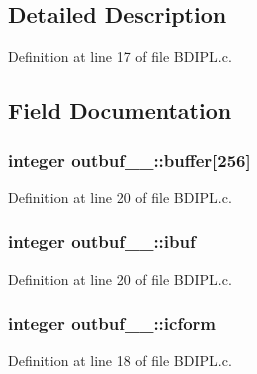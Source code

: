 \subsection{Detailed Description}


Definition at line 17 of file B\+D\+I\+P\+L.\+c.



\subsection{Field Documentation}
\subsubsection[{\texorpdfstring{buffer}{buffer}}]{\setlength{\rightskip}{0pt plus 5cm}integer outbuf\+\_\+\_\+\+::buffer\mbox{[}256\mbox{]}}\hypertarget{structoutbuf__1___a8eec95aab202f7fc976c344442d7a03d}{}\label{structoutbuf__1___a8eec95aab202f7fc976c344442d7a03d}


Definition at line 20 of file B\+D\+I\+P\+L.\+c.

\subsubsection[{\texorpdfstring{ibuf}{ibuf}}]{\setlength{\rightskip}{0pt plus 5cm}integer outbuf\+\_\+\_\+\+::ibuf}\hypertarget{structoutbuf__1___acda118a94cb8b877283965c2ebb78897}{}\label{structoutbuf__1___acda118a94cb8b877283965c2ebb78897}


Definition at line 20 of file B\+D\+I\+P\+L.\+c.

\subsubsection[{\texorpdfstring{icform}{icform}}]{\setlength{\rightskip}{0pt plus 5cm}integer outbuf\+\_\+\_\+\+::icform}\hypertarget{structoutbuf__1___a6b47c53d77563c0f5b5c45157c3ee387}{}\label{structoutbuf__1___a6b47c53d77563c0f5b5c45157c3ee387}


Definition at line 18 of file B\+D\+I\+P\+L.\+c.

